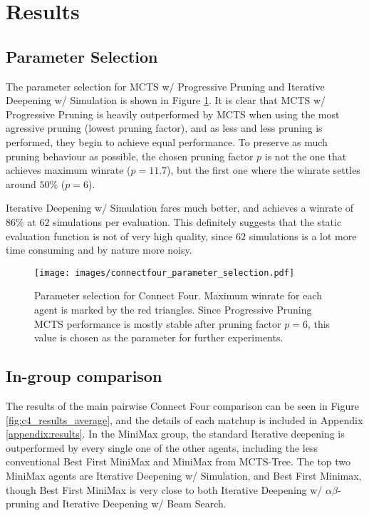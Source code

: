 \section{Results}

\subsection{Parameter Selection}
The parameter selection for MCTS w/ Progressive Pruning and Iterative Deepening w/ Simulation is shown in Figure \ref{fig:parameter_selection}. It is clear that MCTS w/ Progressive Pruning is heavily outperformed by MCTS when using the most agressive pruning (lowest pruning factor), and as less and less pruning is performed, they begin to achieve equal performance. To preserve as much pruning behaviour as possible, the chosen pruning factor $p$ is not the one that achieves maximum winrate ($p=11.7$), but the first one where the winrate settles around $50\%$ ($p=6$).

Iterative Deepening w/ Simulation fares much better, and achieves a winrate of $86\%$ at $62$ simulations per evaluation. This definitely suggests that the static evaluation function is not of very high quality, since $62$ simulations is a lot more time consuming and by nature more noisy.

\begin{figure}[H]
    \centering
    \texttt{[image: images/connectfour\_parameter\_selection.pdf]}
    \caption{Parameter selection for Connect Four. Maximum winrate for each
    agent is marked by the red triangles. Since Progressive Pruning MCTS 
    performance is mostly stable after pruning factor $p=6$, this value
    is chosen as the parameter for further experiments.}
    \label{fig:parameter_selection}
\end{figure}

\subsection{In-group comparison}
The results of the main pairwise Connect Four comparison can be seen in Figure \ref{fig:c4_results_average}, and the details of each matchup is included in Appendix \ref{appendix:results}. In the MiniMax group, the standard Iterative deepening is outperformed by every single one of the other agents, including the less conventional Best First MiniMax and MiniMax from MCTS-Tree. The top two MiniMax agents are Iterative Deepening w/ Simulation, and Best First Minimax, though Best First MiniMax is very close to both Iterative Deepening w/ $\alpha\beta$-pruning and Iterative Deepening w/ Beam Search. 

